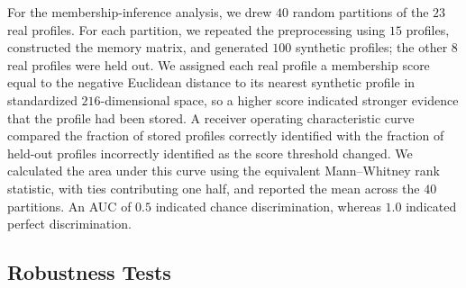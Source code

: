 For the membership-inference analysis, we drew $40$ random partitions of the $23$ real
profiles. For each partition, we repeated the preprocessing using $15$ profiles, constructed
the memory matrix, and generated $100$ synthetic profiles; the other $8$ real profiles were
held out. We assigned each real profile a membership score equal to the negative Euclidean
distance to its nearest synthetic profile in standardized $216$-dimensional space, so a
higher score indicated stronger evidence that the profile had been stored. A receiver
operating characteristic curve compared the fraction of stored profiles correctly identified
with the fraction of held-out profiles incorrectly identified as the score threshold changed.
We calculated the area under this curve using the equivalent Mann--Whitney rank statistic,
with ties contributing one half, and reported the mean across the $40$ partitions. An AUC of
$0.5$ indicated chance discrimination, whereas $1.0$ indicated perfect discrimination.

\subsection{Robustness Tests}
\label{sec:robustness-benchmarks}

